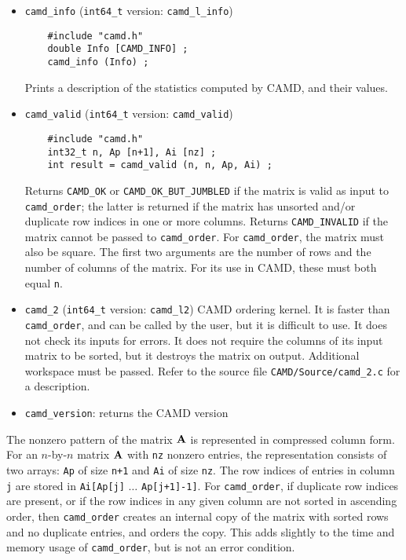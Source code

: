\documentclass[11pt]{article}
\newcommand{\m}[1]{{\bf{#1}}}       %
\begin{document}
\begin{itemize}
\item {\tt camd\_info}
(\verb'int64_t' version: {\tt camd\_l\_info})
    {\footnotesize
    \begin{verbatim}
    #include "camd.h"
    double Info [CAMD_INFO] ;
    camd_info (Info) ;
    \end{verbatim}
    }
    Prints a description of the statistics computed by CAMD, and their values.

\item {\tt camd\_valid}
(\verb'int64_t' version: {\tt camd\_valid})
    {\footnotesize
    \begin{verbatim}
    #include "camd.h"
    int32_t n, Ap [n+1], Ai [nz] ;
    int result = camd_valid (n, n, Ap, Ai) ;
    \end{verbatim}
    }
    Returns {\tt CAMD\_OK} or {\tt CAMD\_OK\_BUT\_JUMBLED}
    if the matrix is valid as input to {\tt camd\_order};
    the latter is returned if the matrix has unsorted and/or duplicate
    row indices in one or more columns. 
    Returns {\tt CAMD\_INVALID} if the matrix cannot be passed to
    {\tt camd\_order}.
    For {\tt camd\_order}, the matrix must
    also be square.  The first two arguments are the number of rows and the
    number of columns of the matrix.  For its use in CAMD, these must both
    equal {\tt n}.

\item {\tt camd\_2}
(\verb'int64_t' version: {\tt camd\_l2})
    CAMD ordering kernel.  It is faster than {\tt camd\_order}, and
    can be called by the user, but it is difficult to use.
    It does not check its inputs for errors.
    It does not require the columns of its input matrix to be sorted,
    but it destroys the matrix on output.  Additional workspace must be passed.
    Refer to the source file {\tt CAMD/Source/camd\_2.c} for a description.

\item \verb'camd_version': returns the CAMD version

\end{itemize}

The nonzero pattern of the matrix $\m{A}$ is represented in compressed column
form.
For an $n$-by-$n$ matrix $\m{A}$ with {\tt nz} nonzero entries, the
representation consists of two arrays: {\tt Ap} of size {\tt n+1} and {\tt Ai}
of size {\tt nz}.  The row indices of entries in column {\tt j} are stored in
    {\tt Ai[Ap[j]} $\ldots$ {\tt Ap[j+1]-1]}.
For {\tt camd\_order},
if duplicate row indices are present, or if the row indices in any given
column are not sorted in ascending order, then {\tt camd\_order} creates
an internal copy of the matrix with sorted rows and no duplicate entries,
and orders the copy.  This adds slightly to the time and memory usage of
{\tt camd\_order}, but is not an error condition.
\end{document}
